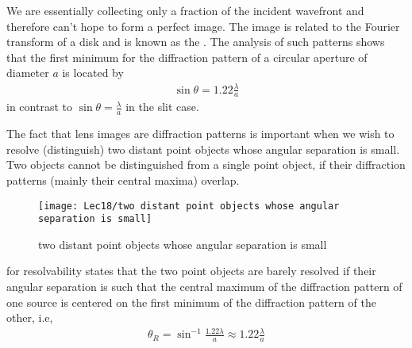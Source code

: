 We are essentially collecting only a fraction of the incident wavefront and therefore can't hope to form a perfect image. The image is related to the Fourier transform of a disk and is known as the . The analysis of such patterns shows that the first minimum for the diffraction pattern of a circular aperture of diameter $a$ is located by
\begin{align*}
    \sin\theta=1.22\frac{\lambda}{a}
\end{align*}
in contrast to $\sin\theta=\frac{\lambda}{a}$ in the slit case.

The fact that lens images are diffraction patterns is important when we wish to resolve (distinguish) two distant point objects whose angular separation is small. Two objects cannot be distinguished from a single point object, if their diffraction patterns (mainly their central maxima) overlap.

\begin{figure}[H]
    \centering
    \texttt{[image: Lec18/two distant point objects whose angular separation is small]}
    \caption{two distant point objects whose angular separation is small}
\end{figure} 

 for resolvability states that the two point objects are barely resolved if their angular separation is such that the central maximum of the diffraction pattern of one source is centered on the first minimum of the diffraction pattern of the other, i.e, 
\begin{align*}
    \theta_R=\sin^{-1}\frac{1.22\lambda}{a}\approx 1.22\frac{\lambda}{a}
\end{align*}